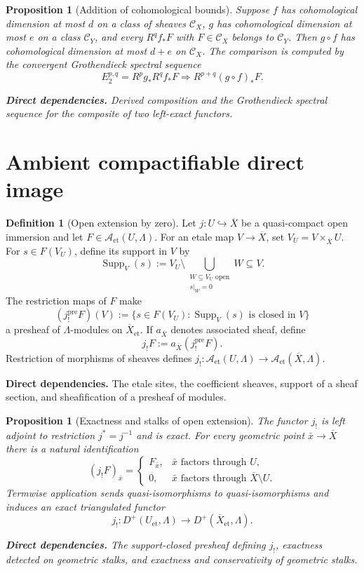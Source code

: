 \documentclass[10pt]{article}
\newtheorem{proposition}[theorem]{Proposition}
\theoremstyle{definition}
\newtheorem{definition}[theorem]{Definition}
\newcommand{\deps}[1]{\par\smallskip\noindent\textbf{Direct dependencies.} #1}
\begin{document}
\begin{proposition}[Addition of cohomological bounds]
\label{prop:add-cd}
Suppose $f$ has cohomological dimension at most $d$ on a class of sheaves
$\mathcal C_X$, $g$ has cohomological dimension at most $e$ on a class
$\mathcal C_Y$, and every $R^qf_*F$ with $F\in\mathcal C_X$ belongs to
$\mathcal C_Y$.  Then $g\circ f$ has cohomological dimension at most $d+e$
on $\mathcal C_X$.  The comparison is computed by the convergent
Grothendieck spectral sequence
\[
 E_2^{p,q}=R^pg_*R^qf_*F
 \Longrightarrow R^{p+q}(g\circ f)_*F.
\]
\deps{Derived composition and the Grothendieck spectral sequence for the
composite of two left-exact functors.}
\end{proposition}

\section{Ambient compactifiable direct image}

\begin{definition}[Open extension by zero]
Let $j:U\hookrightarrow\overline X$ be a quasi-compact open immersion and
let $F\in\mathcal A_{\mathrm{et}}(U,\Lambda)$.  For an etale map
$V\to\overline X$, set $V_U=V\times_{\overline X}U$.  For
$s\in F(V_U)$, define its support in $V$ by
\[
 \operatorname{Supp}_V(s)
 :=V_U\setminus
 \bigcup_{\substack{W\subseteq V_U\text{ open}\\ s|_W=0}}W
 \subseteq V.
\]
The restriction maps of $F$ make
\[
 (j^{\mathrm{pre}}_!F)(V)
 :=\{s\in F(V_U):\operatorname{Supp}_V(s)\text{ is closed in }V\}
\]
a presheaf of $\Lambda$-modules on $\overline X_{\mathrm{et}}$.  If
$a_{\overline X}$ denotes associated sheaf, define
\[
 j_!F:=a_{\overline X}(j^{\mathrm{pre}}_!F).
\]
Restriction of morphisms of sheaves defines
$j_!:\mathcal A_{\mathrm{et}}(U,\Lambda)\to
\mathcal A_{\mathrm{et}}(\overline X,\Lambda)$.
\deps{The etale sites, the coefficient sheaves, support of a sheaf section,
and sheafification of a presheaf of modules.}
\end{definition}

\begin{proposition}[Exactness and stalks of open extension]
The functor $j_!$ is left adjoint to restriction
$j^*=j^{-1}$ and is exact.  For every geometric point
$\bar x\to\overline X$ there is a natural identification
\[
 (j_!F)_{\bar x}= 
 \begin{cases}
   F_{\bar x},&\bar x\text{ factors through }U,\\
   0,&\bar x\text{ factors through }\overline X\setminus U.
 \end{cases}
\]
Termwise application sends quasi-isomorphisms to quasi-isomorphisms and
induces an exact triangulated functor
\[
 j_!:D^+(U_{\mathrm{et}},\Lambda)\longrightarrow
      D^+(\overline X_{\mathrm{et}},\Lambda).
\]
\deps{The support-closed presheaf defining $j_!$, exactness detected on
geometric stalks, and exactness and conservativity of geometric stalks.}
\end{proposition}
\end{document}
